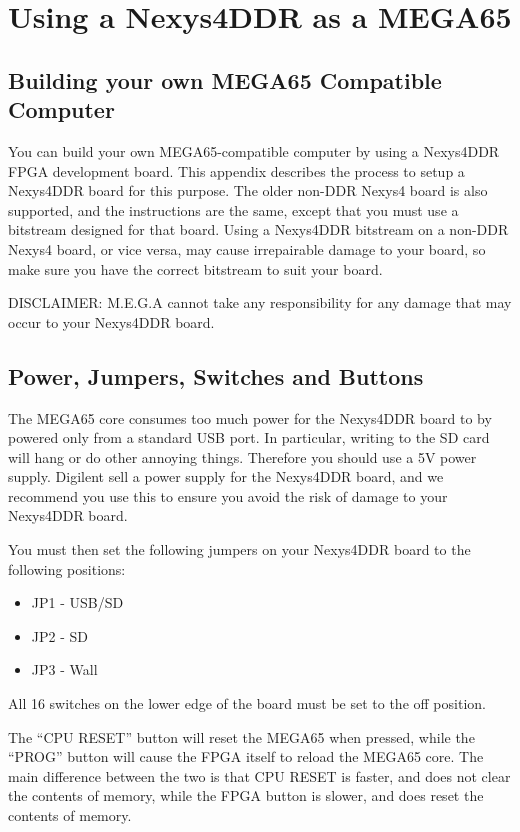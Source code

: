 \chapter{Using a Nexys4DDR as a MEGA65}

\section{Building your own MEGA65 Compatible Computer}

You can build your own MEGA65-compatible computer by using a Nexys4DDR FPGA development board.
This appendix describes the process to setup a Nexys4DDR board for this purpose.
The older non-DDR Nexys4 board is also supported, and the instructions are the same, except that
you must use a bitstream designed for that board.
Using a Nexys4DDR bitstream on a non-DDR Nexys4 board, or vice versa, may cause irrepairable damage to your board, so make sure
you have the correct bitstream to suit your board.


DISCLAIMER: M.E.G.A cannot take any responsibility for any damage that may occur to your Nexys4DDR board.

\newpage

\section{Power, Jumpers, Switches and Buttons}

The MEGA65 core consumes too much power for the Nexys4DDR board to by powered only from a standard USB port.
In particular, writing to the SD card will hang or do other annoying things.
Therefore you should use a 5V power supply.
Digilent sell a power supply for the Nexys4DDR board, and we recommend you use this to ensure you avoid the risk of damage
to your Nexys4DDR board.

You must then set the following jumpers on your Nexys4DDR board to the following positions:

\begin{itemize}
\item{JP1} - USB/SD
\item{JP2} - SD
\item {JP3} - Wall
\end{itemize}


All 16 switches on the lower edge of the board must be set to the off position.

The ``CPU RESET'' button will reset the MEGA65 when pressed, while the ``PROG'' button will cause the FPGA itself to reload the MEGA65
core.  The main difference between the two is that CPU RESET is faster, and does not clear the contents of memory, while the FPGA button
is slower, and does reset the contents of memory.

